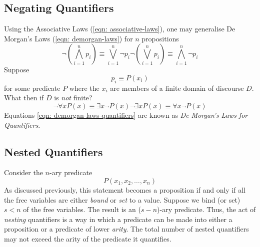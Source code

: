 \documentclass[twocolumn]{report}
\begin{document}
\subsection{Negating Quantifiers}
Using the Associative Laws (\ref{eqn: associative-laws}), one may generalise De Morgan's Laws (\ref{eqn: demorgan-laws}) for $n$ propositions
\begin{subequations}
	\begin{equation}
		\neg \left(\bigwedge_{i = 1}^{n} p_{i}\right) \equiv \bigvee_{i=1}^{n}\neg p_{i}
		\label{eqn: general-demorgan-1}
	\end{equation}
	\begin{equation}
		\neg \left(\bigvee_{i = 1}^{n} p_{i}\right) \equiv \bigwedge_{i=1}^{n}\neg p_{i}
		\label{eqn: general-demorgan-2}
	\end{equation}
	\label{eqn: general-demorgan-laws}
\end{subequations}
Suppose  
\[
	p_{i} \equiv P(x_{i})
\]
for some predicate $P$ where the $x_{i}$ are members of a finite domain of discourse $D$.
What then if $D$ is \textit{not} finite?
\begin{subequations}
	\begin{equation}
		\neg \forall xP(x) \equiv \exists x\neg P(x)
		\label{eqn: univeral-quantifier-negation}
	\end{equation}
	\begin{equation}
		\neg \exists xP(x) \equiv \forall x\neg P(x)
		\label{eqn: existential-quantifier-negation}
	\end{equation}
	\label{eqn: demorgan-laws-quantifiers}
\end{subequations}
Equations \ref{eqn: demorgan-laws-quantifiers} are known as \textit{De Morgan's Laws for Quantifiers}.

\subsection{Nested Quantifiers}
Consider the $n$-ary predicate
\[
	P(x_{1}, x_{2}, \dots, x_{n})
\]
As discussed previously, this statement becomes a proposition if and only if all the free variables are either \textit{bound} or \textit{set} to a value.
Suppose we bind (or set) $s < n$ of the free variables. 
The result is  an ($s-n$)-ary predicate.
Thus, the act of \textit{nesting} quantifiers is a way in which a predicate can be made into either a proposition or a predicate of lower \textit{arity}. 
The total number of nested quantifiers may not exceed the arity of the predicate it quantifies.
\end{document}
